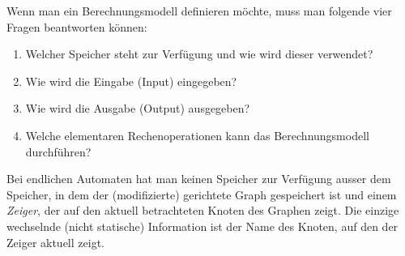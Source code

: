 Wenn man ein Berechnungsmodell definieren möchte, muss man folgende vier Fragen beantworten können:
\begin{enumerate}
	\item Welcher Speicher steht zur Verfügung und wie wird dieser verwendet?
	\item Wie wird die Eingabe (Input) eingegeben?
	\item Wie wird die Ausgabe (Output) ausgegeben?
	\item Welche elementaren Rechenoperationen kann das Berechnungsmodell durchführen?
\end{enumerate}
Bei endlichen Automaten hat man keinen Speicher zur Verfügung ausser dem Speicher, in dem der (modifizierte) gerichtete Graph gespeichert ist und einem \textit{Zeiger}, der auf den aktuell betrachteten Knoten des Graphen zeigt. Die einzige wechselnde (nicht statische) Information ist der Name des Knoten, auf den der Zeiger aktuell zeigt.

